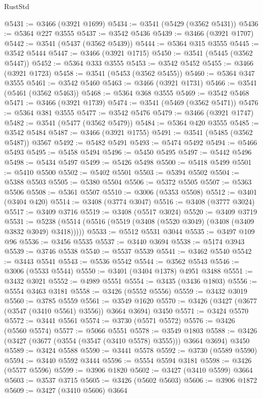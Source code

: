 \begin{lexlean}{RustStd}
\begin{coremodule}
@5431 := @3466 (@3921 @1699)
@5434 := @3541 (@5429 (@3562 @5431))
@5436 := @5364 @227 @3555
@5437 := @3542 @5436
@5439 := @3466 (@3921 @1707)
@5442 := @3541 (@5437 (@3562 @5439))
@5444 := @5364 @315 @3555
@5445 := @3542 @5444
@5447 := @3466 (@3921 @1715)
@5450 := @3541 (@5445 (@3562 @5447))
@5452 := @5364 @333 @3555
@5453 := @3542 @5452
@5455 := @3466 (@3921 @1723)
@5458 := @3541 (@5453 (@3562 @5455))
@5460 := @5364 @347 @3555
@5461 := @3542 @5460
@5463 := @3466 (@3921 @1731)
@5466 := @3541 (@5461 (@3562 @5463))
@5468 := @5364 @368 @3555
@5469 := @3542 @5468
@5471 := @3466 (@3921 @1739)
@5474 := @3541 (@5469 (@3562 @5471))
@5476 := @5364 @381 @3555
@5477 := @3542 @5476
@5479 := @3466 (@3921 @1747)
@5482 := @3541 (@5477 (@3562 @5479))
@5484 := @5364 @420 @3555
@5485 := @3542 @5484
@5487 := @3466 (@3921 @1755)
@5491 := @3541 (@5485 (@3562 @5487)) @3567
@5492 := @5482 @5491
@5493 := @5474 @5492
@5494 := @5466 @5493
@5495 := @5458 @5494
@5496 := @5450 @5495
@5497 := @5442 @5496
@5498 := @5434 @5497
@5499 := @5426 @5498
@5500 := @5418 @5499
@5501 := @5410 @5500
@5502 := @5402 @5501
@5503 := @5394 @5502
@5504 := @5388 @5503
@5505 := @5380 @5504
@5506 := @5372 @5505
@5507 := @5363 @5506
@5508 := @5361 @5507
@5510 := @3006 (@5353 @5508)
@5512 := @3401 (@3404 @420)
@5514 := @3408 (@3774 @3047)
@5516 := @3408 (@3777 @3024)
@5517 := @3409 @3716
@5519 := @3408 (@5517 @3024)
@5520 := @3409 @3719
@5531 := @5238 (@5514 (@5516 (@5519 (@3408 (@5520 @3049) (@3408 (@3409 @3832 @3049) @3418)))))
@5533 := @5512 @5531 @3044
@5535 := @3497 @109 @96
@5536 := @3456 @5535
@5537 := @3440 @3694
@5538 := @5174 @3943
@5539 := @3746 @5538
@5540 := @5537 @5539
@5541 := @3462 @5540
@5542 := @3443 @5541
@5543 := @5536 @5542
@5544 := @3562 @5543
@5546 := @3006 (@5533 @5544)
@5550 := @3401 (@3404 @1378) @4951 @3488
@5551 := @3432 @3021
@5552 := @4989 @5551
@5554 := @3435 (@3436 @1803)
@5556 := @5554 @3463 @3181
@5558 := @3426 (@5552 @5556)
@5559 := @3432 @3019
@5560 := @3785 @5559
@5561 := @3549 @1620
@5570 := @3426 (@3427 (@3677 (@3547 (@3410 @5561) @3556)) @3664 @3694) @3450
@5571 := @3424 @5570
@5572 := @3441 @5561
@5574 := @3730 (@5571 @5572)
@5576 := @3426 (@5560 @5574)
@5577 := @5066 @5551
@5578 := @3549 @1803
@5588 := @3426 (@3427 (@3677 (@3554 (@3547 (@3410 @5578) @3555))) @3664 @3694) @3450
@5589 := @3424 @5588
@5590 := @3441 @5578
@5592 := @3730 (@5589 @5590)
@5594 := @3440 @5592 @3444
@5596 := @5554 @5594 @3181
@5598 := @3426 (@5577 @5596)
@5599 := @3906 @1820
@5602 := @3427 (@3410 @5599) @3664
@5603 := @3537 @3715
@5605 := @3426 (@5602 @5603)
@5606 := @3906 @1872
@5609 := @3427 (@3410 @5606) @3664

\end{coremodule}
\end{lexlean}

